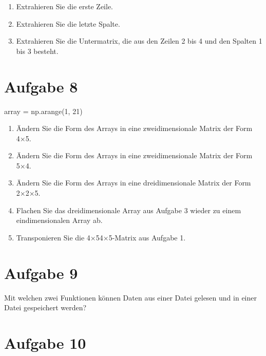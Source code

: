 \documentclass[
  letterpaper,
  DIV=11,
  numbers=noendperiod]{scrreprt}
\newenvironment{Shaded}{\begin{snugshade}}{\end{snugshade}}
\newcommand{\DecValTok}[1]{\textcolor[rgb]{0.68,0.00,0.00}{#1}}
\newcommand{\NormalTok}[1]{\textcolor[rgb]{0.00,0.23,0.31}{#1}}
\newcommand{\OperatorTok}[1]{\textcolor[rgb]{0.37,0.37,0.37}{#1}}
\providecommand{\tightlist}{%
  \setlength{\itemsep}{0pt}\setlength{\parskip}{0pt}}\usepackage{longtable,booktabs,array}
\begin{document}
\begin{enumerate}
\def\labelenumi{\arabic{enumi}.}
\tightlist
\item
  Extrahieren Sie die erste Zeile.
\item
  Extrahieren Sie die letzte Spalte.
\item
  Extrahieren Sie die Untermatrix, die aus den Zeilen 2 bis 4 und den
  Spalten 1 bis 3 besteht.
\end{enumerate}

\section*{Aufgabe 8}\label{aufgabe-8}


\begin{Shaded}
\begin{Highlighting}[]
\NormalTok{array }\OperatorTok{=}\NormalTok{ np.arange(}\DecValTok{1}\NormalTok{, }\DecValTok{21}\NormalTok{)}
\end{Highlighting}
\end{Shaded}

\begin{enumerate}
\def\labelenumi{\arabic{enumi}.}
\tightlist
\item
  Ändern Sie die Form des Arrays in eine zweidimensionale Matrix der
  Form 4×5.
\item
  Ändern Sie die Form des Arrays in eine zweidimensionale Matrix der
  Form 5×4.
\item
  Ändern Sie die Form des Arrays in eine dreidimensionale Matrix der
  Form 2×2×5.
\item
  Flachen Sie das dreidimensionale Array aus Aufgabe 3 wieder zu einem
  eindimensionalen Array ab.
\item
  Transponieren Sie die 4×54×5-Matrix aus Aufgabe 1.
\end{enumerate}

\section*{Aufgabe 9}\label{aufgabe-9}


Mit welchen zwei Funktionen können Daten aus einer Datei gelesen und in
einer Datei gespeichert werden?

\section*{Aufgabe 10}\label{aufgabe-10}
\end{document}
